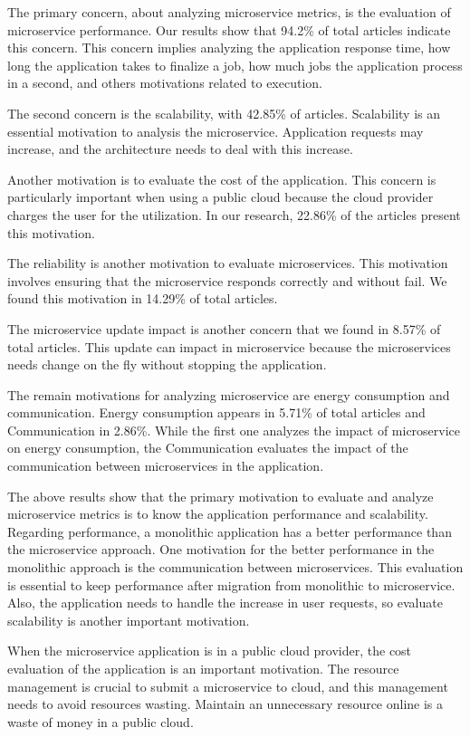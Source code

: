 The primary concern, about analyzing microservice metrics, is the evaluation of microservice performance. Our results show that 94.2\% of total articles indicate this concern. This concern implies analyzing the application response time, how long the application takes to finalize a job, how much jobs the application process in a second, and others motivations related to execution.

The second concern is the scalability, with 42.85\% of articles. Scalability is an essential motivation to analysis the microservice. Application requests may increase, and the architecture needs to deal with this increase. 

Another motivation is to evaluate the cost of the application. This concern is particularly important when using a public cloud because the cloud provider charges the user for the utilization. In our research, 22.86\% of the articles present this motivation. 

The reliability is another motivation to evaluate microservices. This motivation involves ensuring that the microservice responds correctly and without fail.  We found this motivation in 14.29\% of total articles.

The microservice update impact is another concern that we found in 8.57\% of total articles. This update can impact in microservice because the microservices needs change on the fly without stopping the application. 

The remain motivations for analyzing microservice are energy consumption and communication. Energy consumption appears in 5.71\% of total articles and Communication in 2.86\%. While the first one analyzes the impact of microservice on energy consumption, the Communication evaluates the impact of the communication between microservices in the application.

The above results show that the primary motivation to evaluate and analyze microservice metrics is to know the application performance and scalability. Regarding performance, a monolithic application has a better performance than the microservice approach. One motivation for the better performance in the monolithic approach is the communication between microservices. This evaluation is essential to keep performance after migration from monolithic to microservice. Also, the application needs to handle the increase in user requests, so evaluate scalability is another important motivation. 

When the microservice application is in a public cloud provider, the cost evaluation of the application is an important motivation. The resource management is crucial to submit a microservice to cloud, and this management needs to avoid resources wasting. Maintain an unnecessary resource online is a waste of money in a public cloud.

